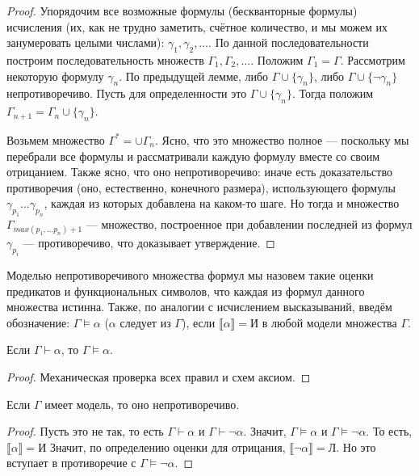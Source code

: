 \begin{proof}
Упорядочим все возможные формулы (бескванторные формулы) 
исчисления (их, как не трудно заметить,
счётное количество, и мы можем их занумеровать целыми числами):
$\gamma_1, \gamma_2, \dots$. По данной последовательности построим
последовательность множеств $\Gamma_1, \Gamma_2, \dots$.
Положим $\Gamma_1 = \Gamma$.
Рассмотрим некоторую формулу $\gamma_n$. По предыдущей лемме, либо 
$\Gamma \cup \{\gamma_n\}$, либо $\Gamma \cup \{\neg\gamma_n\}$ 
непротиворечиво. Пусть для определенности это $\Gamma \cup \{\gamma_n\}$.
Тогда положим $\Gamma_{n+1} = \Gamma_n \cup \{\gamma_n\}$.

Возьмем множество $\Gamma^* = \cup \Gamma_n$. Ясно, что это множество
полное --- поскольку мы перебрали все формулы и рассматривали каждую
формулу вместе со своим отрицанием.
Также ясно, что оно непротиворечиво: иначе есть
доказательство противоречия (оно, естественно, конечного размера),
использующего формулы $\gamma_{p_1} \dots \gamma_{p_n}$, каждая из которых
добавлена на каком-то шаге. Но тогда и множество 
$\Gamma_{max(p_1, \dots p_n)+1}$ --- множество, построенное при добавлении
последней из формул $\gamma_{p_i}$ --- противоречиво, что доказывает 
утверждение.
\end{proof}

\begin{definition}
Моделью непротиворечивого множества формул мы назовем такие
оценки предикатов и функциональных символов, что каждая из формул данного
множества истинна. Также, по аналогии с исчислением высказываний,
введём обозначение: $\Gamma \models \alpha$ ($\alpha$ следует из $\Gamma$), 
если $\llbracket \alpha \rrbracket = \texttt{И}$ в любой модели
множества $\Gamma$.
\end{definition}

\begin{theorem}
Если $\Gamma \vdash \alpha$, то $\Gamma \models \alpha$.
\end{theorem}

\begin{proof}
Механическая проверка всех правил и схем аксиом.
\end{proof}

\begin{theorem}
Если $\Gamma$ имеет модель, то оно непротиворечиво.
\end{theorem}

\begin{proof}
Пусть это не так, то есть $\Gamma \vdash \alpha$ и $\Gamma \vdash \neg \alpha$.
Значит, $\Gamma \models \alpha$ и $\Gamma \models \neg \alpha$. То есть,
$\llbracket \alpha \rrbracket = \texttt{И}$
Значит, по определению оценки для отрицания, $\llbracket \neg\alpha \rrbracket = \texttt{Л}$.
Но это вступает в противоречие с $\Gamma \models \neg \alpha$.
\end{proof}

